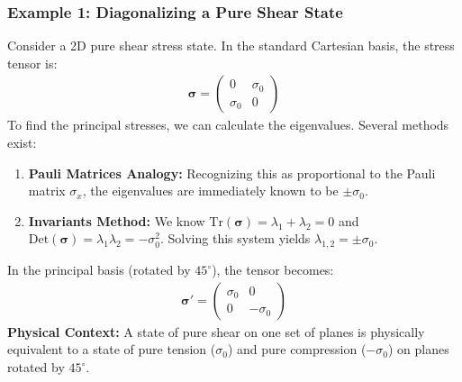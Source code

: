 \subsubsection*{Example 1: Diagonalizing a Pure Shear State}
Consider a 2D pure shear stress state. In the standard Cartesian basis, the stress tensor is:
\begin{align}
    \mathbf{\sigma} = \begin{pmatrix} 0 & \sigma_0 \\ \sigma_0 & 0 \end{pmatrix}
\end{align}
To find the principal stresses, we can calculate the eigenvalues. Several methods exist:
\begin{enumerate}
    \item \textbf{Pauli Matrices Analogy:} Recognizing this as proportional to the Pauli matrix $\sigma_x$, the eigenvalues are immediately known to be $\pm \sigma_0$.
    \item \textbf{Invariants Method:} We know $\text{Tr}(\mathbf{\sigma}) = \lambda_1 + \lambda_2 = 0$ and $\text{Det}(\mathbf{\sigma}) = \lambda_1 \lambda_2 = -\sigma_0^2$. Solving this system yields $\lambda_{1,2} = \pm \sigma_0$.
\end{enumerate}
In the principal basis (rotated by $45^\circ$), the tensor becomes:
\begin{align}
    \mathbf{\sigma}' = \begin{pmatrix} \sigma_0 & 0 \\ 0 & -\sigma_0 \end{pmatrix}
\end{align}
\textbf{Physical Context:} A state of pure shear on one set of planes is physically equivalent to a state of pure tension ($\sigma_0$) and pure compression ($-\sigma_0$) on planes rotated by $45^\circ$.

